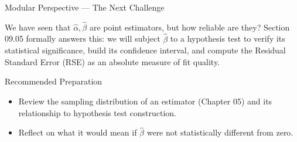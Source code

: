 \documentclass[10pt, aspectratio=169]{beamer}
\begin{document}
\begin{frame}{Modular Perspective --- The Next Challenge}
  \scriptsize
  \begin{retoclase}
    We have seen that $\hat\alpha,\hat\beta$ are point estimators, but how reliable are they? Section 09.05 formally answers this: we will subject $\hat\beta$ to a hypothesis test to verify its statistical significance, build its confidence interval, and compute the Residual Standard Error (RSE) as an absolute measure of fit quality.
  \end{retoclase}

  \vspace{0.08cm}
  \pause
  \begin{alertblock}{Recommended Preparation}
    \begin{itemize}\itemsep=0.06cm
      \item Review the sampling distribution of an estimator (Chapter 05) and its relationship to hypothesis test construction.
      \item Reflect on what it would mean if $\hat\beta$ were not statistically different from zero.
    \end{itemize}
  \end{alertblock}
\end{frame}
\end{document}
